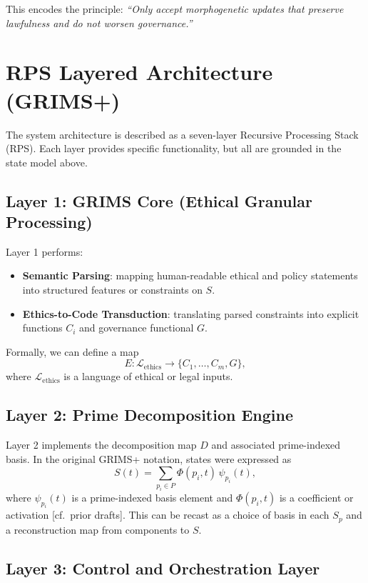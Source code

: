 \documentclass[11pt]{article}
\begin{document}
This encodes the principle: \emph{``Only accept morphogenetic updates that preserve lawfulness and do not worsen governance.''}

\section{RPS Layered Architecture (GRIMS+)}

The system architecture is described as a seven-layer Recursive Processing Stack (RPS).%
Each layer provides specific functionality, but all are grounded in the state model above.

\subsection{Layer 1: GRIMS Core (Ethical Granular Processing)}

Layer 1 performs:
\begin{itemize}
  \item \textbf{Semantic Parsing}: mapping human-readable ethical and policy statements into structured features or constraints on \(S\).
  \item \textbf{Ethics-to-Code Transduction}: translating parsed constraints into explicit functions \(C_i\) and governance functional \(G\).
\end{itemize}

Formally, we can define a map
\[
  E: \mathcal{L}_{\mathrm{ethics}} \to \{ C_1,\dots,C_m, G \},
\]
where \(\mathcal{L}_{\mathrm{ethics}}\) is a language of ethical or legal inputs.

\subsection{Layer 2: Prime Decomposition Engine}

Layer 2 implements the decomposition map \(D\) and associated prime-indexed basis.%
In the original GRIMS+ notation, states were expressed as
\[
  S(t) = \sum_{p_i \in P} \Phi(p_i, t)\,\psi_{p_i}(t),
\]
where \(\psi_{p_i}(t)\) is a prime-indexed basis element and \(\Phi(p_i, t)\) is a coefficient or activation [cf.\ prior drafts].%
This can be recast as a choice of basis in each \(S_p\) and a reconstruction map from components to \(S\).

\subsection{Layer 3: Control and Orchestration Layer}
\end{document}
